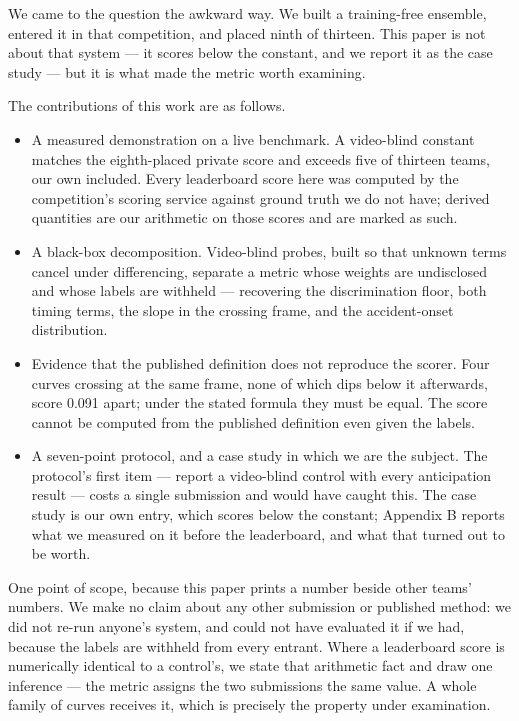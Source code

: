 We came to the question the awkward way. We built a training-free ensemble, entered it in that competition, and placed ninth of thirteen. This paper is not about that system --- it scores below the constant, and we report it as the case study --- but it is what made the metric worth examining.

The contributions of this work are as follows.

\begin{itemize}
\item
  A measured demonstration on a live benchmark. A video-blind constant matches the eighth-placed private score and exceeds five of thirteen teams, our own included. Every leaderboard score here was computed by the competition's scoring service against ground truth we do not have; derived quantities are our arithmetic on those scores and are marked as such.
\item
  A black-box decomposition. Video-blind probes, built so that unknown terms cancel under differencing, separate a metric whose weights are undisclosed and whose labels are withheld --- recovering the discrimination floor, both timing terms, the slope in the crossing frame, and the accident-onset distribution.
\item
  Evidence that the published definition does not reproduce the scorer. Four curves crossing at the same frame, none of which dips below it afterwards, score 0.091 apart; under the stated formula they must be equal. The score cannot be computed from the published definition even given the labels.
\item
  A seven-point protocol, and a case study in which we are the subject. The protocol's first item --- report a video-blind control with every anticipation result --- costs a single submission and would have caught this. The case study is our own entry, which scores below the constant; Appendix B reports what we measured on it before the leaderboard, and what that turned out to be worth.
\end{itemize}

One point of scope, because this paper prints a number beside other teams' numbers. We make no claim about any other submission or published method: we did not re-run anyone's system, and could not have evaluated it if we had, because the labels are withheld from every entrant. Where a leaderboard score is numerically identical to a control's, we state that arithmetic fact and draw one inference --- the metric assigns the two submissions the same value. A whole family of curves receives it, which is precisely the property under examination.

